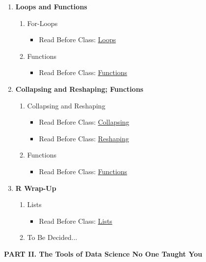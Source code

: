 \documentclass[12pt]{article}
\begin{document}
\begin{enumerate}[label=\textbf{Week \arabic*:}]
	\item \textbf{Loops and Functions}
	\begin{enumerate}[label=Class \arabic*:]
		\item For-Loops
		\begin{itemize}
			\item Read Before Class: \href{https://learnr4ds.com/html/loops.html}{Loops}
		\end{itemize}
		\item Functions
		\begin{itemize}
			\item Read Before Class: \href{https://learnr4ds.com/html/functions.html}{Functions}
		\end{itemize}
	\end{enumerate}

	\item \textbf{Collapsing and Reshaping; Functions}
	\begin{enumerate}[label=Class \arabic*:]
		\item Collapsing and Reshaping
		\begin{itemize}
			\item Read Before Class: \href{https://learnr4ds.com/html/collapsing.html}{Collapsing}
			\item Read Before Class: \href{https://learnr4ds.com/html/reshaping.html}{Reshaping}
		\end{itemize}
		\item Functions
		\begin{itemize}
			\item Read Before Class: \href{https://learnr4ds.com/html/functions.html}{Functions}
		\end{itemize}
	\end{enumerate}

	\item \textbf{R Wrap-Up}
	\begin{enumerate}[label=Class \arabic*:]
		\item Lists
		\begin{itemize}
			\item Read Before Class: \href{https://learnr4ds.com/html/lists.html}{Lists}
		\end{itemize}
		\item To Be Decided...
	\end{enumerate}
\end{enumerate}

\vspace{.4in}
\begin{center}
	\textbf{PART II. The Tools of Data Science No One Taught You}
\end{center}
\vspace{.2in}
\end{document}
